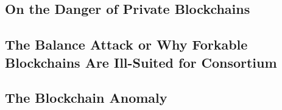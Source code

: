 \subsection{On the Danger of Private Blockchains\cite{Gra16}}


\subsection{The Balance Attack or Why Forkable Blockchains Are Ill-Suited for Consortium\cite{NG17}}


\subsection{The Blockchain Anomaly\cite{NG16}}

